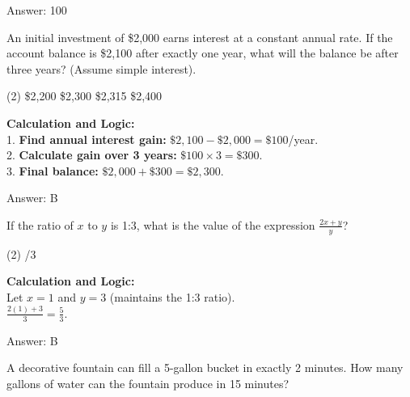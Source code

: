 \documentclass[11pt,paper=a4,answers]{exam}
\begin{document}
\begin{questions}
\begin{solution}
Answer: \colorbox{yellow!100}{100}
\end{solution}

\vspace{60pt}

\question
An initial investment of \$2,000 earns interest at a constant annual rate. If the account balance is \$2,100 after exactly one year, what will the balance be after three years? (Assume simple interest).
\begin{tasks}(2)
    \task \$2,200
    \task \$2,300
    \task \$2,315
    \task \$2,400
\end{tasks}

\begin{solution}
\textbf{Calculation and Logic:} \\
1. \textbf{Find annual interest gain:} $\$2,100 - \$2,000 = \$100$/year. \\
2. \textbf{Calculate gain over 3 years:} $\$100 \times 3 = \$300$. \\
3. \textbf{Final balance:} $\$2,000 + \$300 = \$2,300$.

\vspace{30pt}

Answer: \colorbox{yellow!100}{B}
\end{solution}

\vspace{60pt}

\question
If the ratio of $x$ to $y$ is 1:3, what is the value of the expression $\frac{2x + y}{y}$?
\begin{tasks}(2)
    /3
\end{tasks}

\begin{solution}
\textbf{Calculation and Logic:} \\
Let $x = 1$ and $y = 3$ (maintains the 1:3 ratio). \\
$\frac{2(1) + 3}{3} = \frac{5}{3}$.

\vspace{30pt}

Answer: \colorbox{yellow!100}{B}
\end{solution}

\vspace{60pt}

\question
A decorative fountain can fill a 5-gallon bucket in exactly 2 minutes. How many gallons of water can the fountain produce in 15 minutes?


\end{questions}
\end{document}
